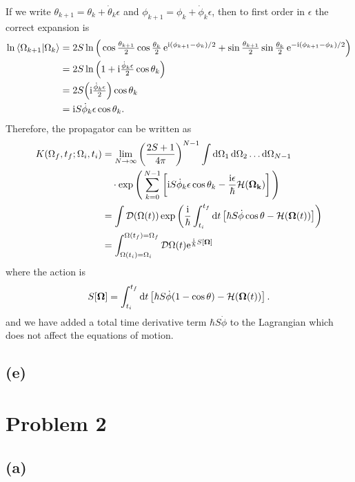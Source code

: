\documentclass{article}
\newcommand{\ii}{\mathrm{i}}
\newcommand{\me}{\mathrm{e}}
\newcommand{\cd}{\mathcal{D}}
\begin{document}
If we write $\theta_{k+1}=\theta_k+\dot{\theta}_k\epsilon$ and $\phi_{k+1}=\phi_k+\dot{\phi}_k\epsilon$, then to first order in $\epsilon$ the correct expansion is
\begin{equation}
    \begin{split}
        \ln{\bra{\Omega_{k+1}}\ket{\Omega_k}}&=2S\ln\Big(\cos\tfrac{\theta_{k+1}}{2}\cos\tfrac{\theta_k}{2}\,\me^{\ii(\phi_{k+1}-\phi_k)/2}+\sin\tfrac{\theta_{k+1}}{2}\sin\tfrac{\theta_k}{2}\,\me^{-\ii(\phi_{k+1}-\phi_k)/2}\Big)\\
        &=2S\ln\Big(1+\ii\tfrac{\dot{\phi}_k\epsilon}{2}\cos\theta_k\Big)\\
        &=2S\Big(\ii\tfrac{\dot{\phi}_k\epsilon}{2}\Big)\cos\theta_k\\
        &=\ii S\dot{\phi}_k\epsilon\cos\theta_k.
    \end{split}
\end{equation}
Therefore, the propagator can be written as
\begin{equation}
    \begin{split}
        K(\Omega_f,t_f;\Omega_i,t_i)&=\lim_{N\to\infty}\left(\frac{2S+1}{4\pi}\right)^{N-1}\int \dd{\Omega_1}\dd{\Omega_2}\dots\dd{\Omega_{N-1}}\\
        &\quad \cdot \exp\Bigg(\sum_{k=0}^{N-1}\left[\ii S\dot{\phi}_k\epsilon\cos\theta_k -\frac{\ii\epsilon}{\hbar}\mathcal{H}(\vb{\Omega_k})\right]\Bigg)\\
        &=\int \cd{(\Omega(t))}\exp\left(\frac{\ii}{\hbar}\int_{t_i}^{t_f}\dd{t}\left[\hbar S \dot{\phi}\cos\theta-\mathcal{H}(\vb{\Omega}(t))\right]\right)\\
        &=\int_{\Omega(t_i)=\Omega_i}^{\Omega(t_f)=\Omega_f}\cd\Omega(t)\me^{\frac{\ii}{\hbar}S[\vb{\Omega}]}
    \end{split}
\end{equation}
where the action is
\begin{equation}
    S[\vb{\Omega}]=\int_{t_i}^{t_f}\dd{t}\left[\hbar S \dot{\phi}(1-\cos\theta)-\mathcal{H}(\vb{\Omega}(t))\right].
\end{equation}
and we have added a total time derivative term $\hbar S \dot{\phi}$ to the Lagrangian which does not affect the equations of motion.

\subsection*{(e)}

\section*{Problem 2}
\subsection*{(a)}

%
%
\end{document}
